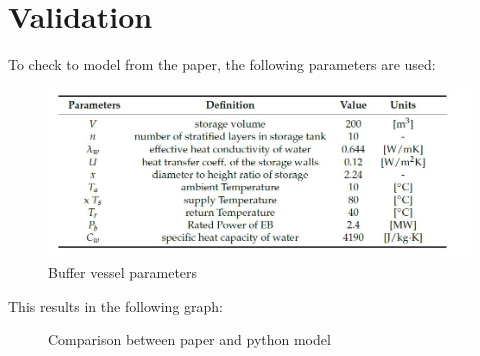 \section{Validation}

To check to model from the paper, the following parameters are used:

\begin{figure}[H]
	\centering
	\includegraphics[width=0.8\columnwidth]{Pictures/parameters_paper.JPG}
	\caption[Short title]{Buffer vessel parameters}
\end{figure}

This results in the following graph:

\begin{figure}[H]%
	\centering
	\qquad
	\caption{Comparison between paper and python model}%
	\label{fig:Comparison}%
\end{figure}